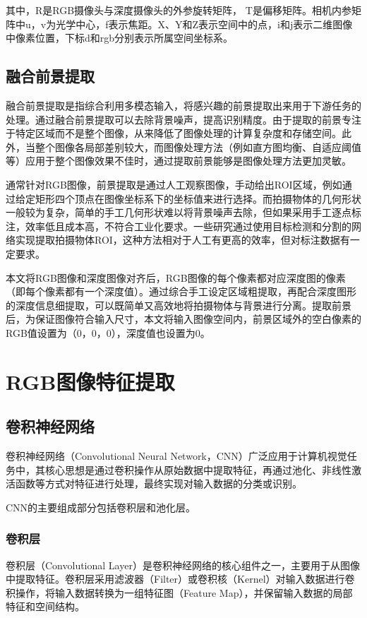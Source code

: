 其中，R是RGB摄像头与深度摄像头的外参旋转矩阵， T是偏移矩阵。相机内参矩阵中u，v为光学中心，f表示焦距。X、Y和Z表示空间中的点，i和j表示二维图像中像素位置，下标d和rgb分别表示所属空间坐标系。

\subsection{融合前景提取}
融合前景提取是指综合利用多模态输入，将感兴趣的前景提取出来用于下游任务的处理。通过融合前景提取可以去除背景噪声，提高识别精度。由于提取的前景专注于特定区域而不是整个图像，从来降低了图像处理的计算复杂度和存储空间。此外，当整个图像各局部差别较大，而图像处理方法（例如直方图均衡、自适应阈值等）应用于整个图像效果不佳时，通过提取前景能够是图像处理方法更加灵敏。

通常针对RGB图像，前景提取是通过人工观察图像，手动给出ROI区域，例如通过给定矩形四个顶点在图像坐标系下的坐标值来进行选择。而拍摄物体的几何形状一般较为复杂，简单的手工几何形状难以将背景噪声去除，但如果采用手工逐点标注，效率低且成本高，不符合工业化要求。一些研究通过使用目标检测和分割的网络实现提取拍摄物体ROI，这种方法相对于人工有更高的效率，但对标注数据有一定要求。

本文将RGB图像和深度图像对齐后，RGB图像的每个像素都对应深度图的像素（即每个像素都有一个深度值）。通过综合手工设定区域粗提取，再配合深度图形的深度信息细提取，可以既简单又高效地将拍摄物体与背景进行分离。提取前景后，为保证图像符合输入尺寸，本文将输入图像空间内，前景区域外的空白像素的RGB值设置为（0，0，0），深度值也设置为0。

\section{RGB图像特征提取}
\subsection{卷积神经网络}
卷积神经网络（Convolutional Neural Network，CNN）广泛应用于计算机视觉任务中，其核心思想是通过卷积操作从原始数据中提取特征，再通过池化、非线性激活函数等方式对特征进行处理，最终实现对输入数据的分类或识别。

CNN的主要组成部分包括卷积层和池化层。

\subsubsection{卷积层}

卷积层（Convolutional Layer）是卷积神经网络的核心组件之一，主要用于从图像中提取特征。卷积层采用滤波器（Filter）或卷积核（Kernel）对输入数据进行卷积操作，将输入数据转换为一组特征图（Feature Map），并保留输入数据的局部特征和空间结构。

